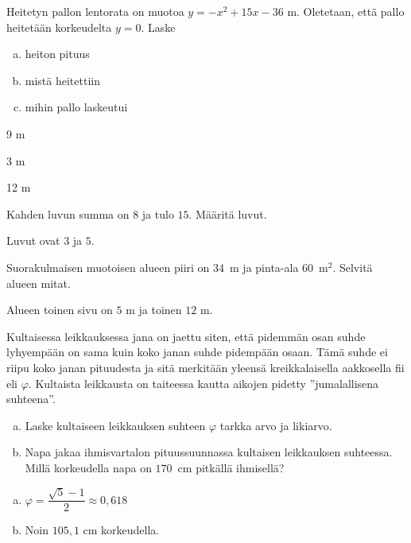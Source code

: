 \begin{tehtavasivu}
\begin{tehtava}
	Heitetyn pallon lentorata on muotoa $y=-x^2+15x-36$ m. Oletetaan, että pallo heitetään korkeudelta $y=0$. Laske
		\begin{enumerate}[a)]
			\item heiton pituus
			\item mistä heitettiin
			\item mihin pallo laskeutui
		\end{enumerate}
	\begin{vastaus}
		\item 9 m
		\item 3 m
		\item 12 m
	\end{vastaus}
\end{tehtava}

\begin{tehtava}
    Kahden luvun summa on $8$ ja tulo $15$. Määritä luvut.
    \begin{vastaus}
		Luvut ovat $3$ ja $5$.
    \end{vastaus}
\end{tehtava}

\begin{tehtava}
    Suorakulmaisen muotoisen alueen piiri on $34$~m ja pinta-ala $60$~m$^2$. Selvitä alueen mitat.
    \begin{vastaus}
		Alueen toinen sivu on $5$ m ja toinen $12$ m.
    \end{vastaus}
\end{tehtava}

\begin{tehtava}
    Kultaisessa leikkauksessa jana on jaettu siten, että pidemmän osan suhde lyhyempään on sama kuin koko janan suhde pidempään osaan. Tämä suhde ei riipu koko janan pituudesta ja sitä merkitään yleensä kreikkalaisella aakkosella fii eli $\varphi$. Kultaista leikkausta on taiteessa kautta aikojen pidetty ''jumalallisena suhteena''.
		\begin{enumerate}[a)]
            \item Laske kultaiseen leikkauksen suhteen $\varphi$ tarkka arvo ja likiarvo.
            \item Napa jakaa ihmisvartalon pituussuunnassa kultaisen leikkauksen suhteessa. Millä korkeudella napa on $170$~cm pitkällä ihmisellä?
        \end{enumerate}
    \begin{vastaus}
        \begin{enumerate}[a)]
            \item $ \varphi = \dfrac{\sqrt{5}-1}{2} \approx 0,618$
            \item Noin $105,1$ cm korkeudella.
        \end{enumerate}
    \end{vastaus}
\end{tehtava}


\end{tehtavasivu}
